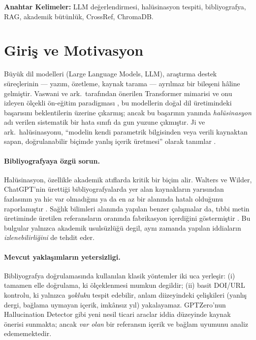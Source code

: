 \documentclass[11pt,a4paper]{article}
\begin{document}
\textbf{Anahtar Kelimeler:} LLM değerlendirmesi, halüsinasyon tespiti,
bibliyografya, RAG, akademik bütünlük, CrossRef, ChromaDB.

\newpage

\section{Giriş ve Motivasyon}
\label{sec:giriş}

Büyük dil modelleri (Large Language Models, LLM), araştırma destek
süreçlerinin --- yazım, özetleme, kaynak tarama --- ayrılmaz bir bileşeni hâline
gelmiştir. Vaswani ve ark.\ tarafından önerilen Transformer mimarisi
\cite{vaswani2017attention} ve onu izleyen ölçekli ön-eğitim paradigması
\cite{devlin2019bert,brown2020gpt3}, bu modellerin doğal dil üretimindeki başarısını
beklentilerin üzerine çıkarmış; ancak bu başarının yanında \emph{halüsinasyon}
adı verilen sistematik bir hata sınıfı da gun yuzune çıkmıştır. Ji ve ark.\
halüsinasyonu, ``modelin kendi parametrik bilgisinden veya verili kaynaktan
sapan, doğrulanabilir biçimde yanlış içerik üretmesi'' olarak tanımlar
\cite{ji2023survey}.

\paragraph{Bibliyografyaya özgü sorun.}
Halüsinasyon, özellikle akademik atıflarda kritik bir biçim alir. Walters ve
Wilder, ChatGPT'nin ürettiği bibliyografyalarda yer alan kaynakların yarısından
fazlasının ya hic var olmadığını ya da en az bir alanında hatalı olduğunu
raporlamıştır \cite{walters2023fabrication}. Sağlık bilimleri alanında yapılan
benzer çalışmalar da, tıbbi metin üretiminde üretilen referansların %
oranında fabrikasyon içerdiğini göstermiştir
\cite{bhattacharyya2023high,athaluri2023exploring}. Bu bulgular yalnızca
akademik usulsüzlüğü degil, aynı zamanda yapılan iddiaların
\emph{izlenebilirliğini} de tehdit eder.

\paragraph{Mevcut yaklaşımların yetersizligi.}
Bibliyografya doğrulamasında kullanılan klasik yöntemler iki uca yerleşir:
(i) tamamen elle doğrulama, ki ölçeklenmesi mumkun degildir; (ii) basit
DOI/URL kontrolu, ki yalnızca \emph{yokluk}u tespit edebilir, anlam diizeyindeki
çelişkileri (yanlış dergi, bağlama uymayan içerik, imkânsız yıl) yakalayamaz.
GPTZero'nun Hallucination Detector gibi yeni nesil ticari araclar iddia
düzeyinde kaynak önerisi sunmakta; ancak \emph{var olan} bir referansın içerik
ve bağlam uyumunu analiz edememektedir.
\end{document}
